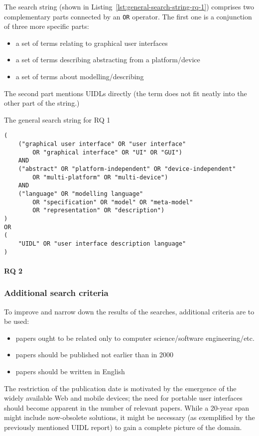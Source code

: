 The search string (shown in Listing~\ref{lst:general-search-string-rq-1})
comprises two complementary parts connected by an \texttt{OR} operator.
The first one is a conjunction of three more specific parts:
\begin{itemize}
    \item a set of terms relating to graphical user interfaces
    \item a set of terms describing abstracting from a platform/device
    \item a set of terms about modelling/describing
\end{itemize}
The second part mentions UIDLs directly (the term does not fit neatly into the other part of the string.)

\begin{listing}
    \caption{The general search string for RQ 1}
    \begin{verbatim}
(
    ("graphical user interface" OR "user interface"
        OR "graphical interface" OR "UI" OR "GUI")
    AND
    ("abstract" OR "platform-independent" OR "device-independent"
        OR "multi-platform" OR "multi-device")
    AND
    ("language" OR "modelling language"
        OR "specification" OR "model" OR "meta-model"
        OR "representation" OR "description")
)
OR
(
    "UIDL" OR "user interface description language"
)
    \end{verbatim}
    \label{lst:general-search-string-rq-1}
\end{listing}

\paragraph{RQ 2}

\subsubsection{Additional search criteria}

To improve and narrow down the results of the searches, additional criteria are to be used:
\begin{itemize}
    \item papers ought to be related only to computer science/software engineering/etc.
    \item {}papers should be published not earlier than in 2000
    \item papers should be written in English
\end{itemize}

The restriction of the publication date is motivated by the emergence of the widely available Web and mobile devices;
the need for portable user interfaces should become apparent in the number of relevant papers.
While a 20-year span might include now-obsolete solutions, it might be necessary
(as exemplified by the previously mentioned UIDL report) to gain a complete picture of the domain.
